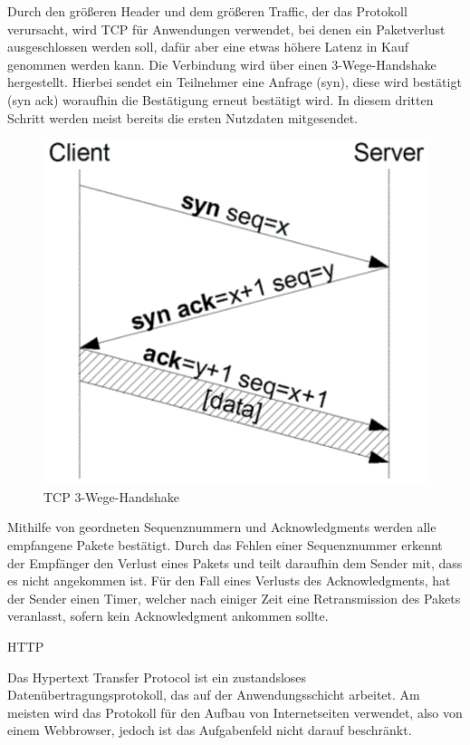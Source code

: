 Durch den größeren Header und dem größeren Traffic, der das Protokoll verursacht, wird TCP für Anwendungen verwendet, bei denen ein Paketverlust ausgeschlossen werden soll, dafür aber eine etwas höhere Latenz in Kauf genommen werden kann. 
Die Verbindung wird über einen 3-Wege-Handshake hergestellt. Hierbei sendet ein Teilnehmer eine Anfrage (syn), diese wird bestätigt (syn ack) woraufhin die Bestätigung erneut bestätigt wird. In diesem dritten Schritt werden meist bereits die ersten Nutzdaten mitgesendet.
\begin{figure}
	\includegraphics[width=\textwidth]{images/TCP_3wayhandshake.pdf}
	\caption{TCP 3-Wege-Handshake}
	\label{fig:tcp_3wayhandshake}
\end{figure}

Mithilfe von geordneten Sequenznummern und Acknowledgments werden alle empfangene Pakete bestätigt. Durch das Fehlen einer Sequenznummer erkennt der Empfänger den Verlust eines Pakets und teilt daraufhin dem Sender mit, dass es nicht angekommen ist. Für den Fall eines Verlusts des Acknowledgments, hat der Sender einen Timer, welcher nach einiger Zeit eine Retransmission des Pakets veranlasst, sofern kein Acknowledgment ankommen sollte.




HTTP

Das Hypertext Transfer Protocol ist ein zustandsloses Datenübertragungsprotokoll, das auf der Anwendungsschicht arbeitet. Am meisten wird das Protokoll für den Aufbau von Internetseiten verwendet, also von einem Webbrowser, jedoch ist das Aufgabenfeld nicht darauf beschränkt.


